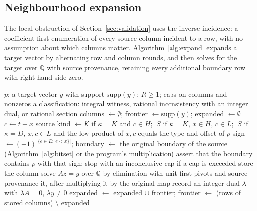 \documentclass[11pt]{article}
\theoremstyle{definition}
\theoremstyle{remark}
\begin{document}
\subsection{Neighbourhood expansion}

The local obstruction of Section~\ref{sec:validation} uses the inverse
incidence: a coefficient-first enumeration of every source column incident to a
row, with no assumption about which columns matter.
Algorithm~\ref{alg:expand} expands a target vector by alternating row and
column rounds, and then solves for the target over $\mathbb Q$ with source
provenance, retaining every additional boundary row with right-hand side zero.

\begin{algorithm}[t]
\caption{Radius-$R$ neighbourhood of a target and its rational solve.}
\label{alg:expand}
\begin{algorithmic}[1]
\Require $p$; a target vector $y$ with support $\mathrm{supp}(y)$; $R\geq1$; caps on columns and nonzeros
\Ensure a classification: integral witness, rational inconsistency with an integer dual, or rational section
\State columns $\gets\emptyset$; frontier $\gets\mathrm{supp}(y)$; expanded $\gets\emptyset$
      \State $c\gets t-x$
      \State source kind $\gets K$ if $\kappa=K$ and $c\in H$; $\ S$ if $\kappa=K$, $x\in H$, $c\in L$; $\ S$ if $\kappa=D$, $x,c\in L$ and the low product of $x,c$ equals the type and offset of $\rho$
        \State sign $\gets(-1)^{|\{e\in E:\ e<x\}|}$; boundary $\gets$ the original boundary of the source (Algorithm~\ref{alg:bitset} or the program's multiplication)
        \State assert that the boundary contains $\rho$ with that sign; stop with an inconclusive cap if a cap is exceeded
        \State store the column
      \EndIf
    \EndFor
  \EndFor
  \State solve $A z=y$ over $\mathbb Q$ by elimination with unit-first pivots and source provenance
   \Return it, after multiplying it by the original map
   record an integer dual $\lambda$ with $\lambda A=0$, $\lambda y\ne0$
  \EndIf
  \State expanded $\gets$ expanded $\cup$ frontier; frontier $\gets$ (rows of stored columns) $\setminus$ expanded
\EndFor
\end{algorithmic}
\end{algorithm}
\end{document}
